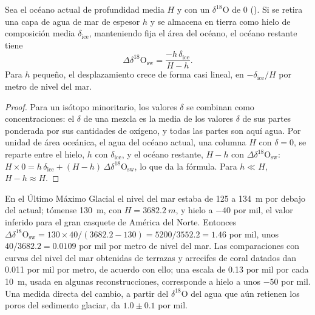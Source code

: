 \begin{proposition}\label{prop:b2:climate-proxies:mass-balance}
Sea el océano actual de profundidad media $H$ y con un $\delta^{18}$O de 0 (). Si se retira una capa de agua
de mar de espesor $h$ y se almacena en tierra como hielo de composición media
$\delta_{\mathrm{ice}}$, manteniendo fija el área del océano, el océano restante tiene
\[
  \Delta\delta^{18}\mathrm{O}_{\mathrm{sw}} = \frac{-h\,\delta_{\mathrm{ice}}}{H - h}.
\]
Para $h$ pequeño, el desplazamiento crece de forma casi lineal, en $-\delta_{\mathrm{ice}}/H$ por metro de nivel del mar.
\end{proposition}

\begin{proof}
Para un isótopo minoritario, los valores $\delta$ se combinan como concentraciones: el $\delta$ de una mezcla es
la media de los valores $\delta$ de sus partes ponderada por sus cantidades de oxígeno, y todas las
partes son aquí agua. Por unidad de área oceánica, el agua del océano actual, una columna $H$ con
$\delta = 0$, se reparte entre el hielo, $h$ con $\delta_{\mathrm{ice}}$, y el océano restante,
$H - h$ con $\Delta\delta^{18}\mathrm{O}_{\mathrm{sw}}$:
$H \times 0 = h\,\delta_{\mathrm{ice}} + (H - h)\,\Delta\delta^{18}\mathrm{O}_{\mathrm{sw}}$, lo que
da la fórmula. Para $h \ll H$, $H - h \approx H$.
\end{proof}

\begin{example}\label{ex:b2:climate-proxies:lgm}
En el Último Máximo Glacial el nivel del mar estaba de 125 a \qty{134}{m} por debajo del actual; tómense \qty{130}{m},
con $H = \qty{3682.2}{m}$, y hielo a $-40$ por mil, el valor inferido para el gran casquete de
América del Norte. Entonces
$\Delta\delta^{18}\mathrm{O}_{\mathrm{sw}} = 130 \times 40/(3682.2 - 130) = 5200/3552.2 = 1.46$
por mil, unos $40/3682.2 = 0.0109$ por mil por metro de nivel del mar. Las comparaciones con curvas del nivel del mar
obtenidas de terrazas y arrecifes de coral datados dan \num{0.011} por mil por metro, de acuerdo con ello; una escala de
\num{0.13} por mil por cada \qty{10}{m}, usada en algunas reconstrucciones, corresponde a hielo a unos
$-50$ por mil. Una medida directa del cambio, a partir del $\delta^{18}$O del agua que aún retienen
los poros del sedimento glaciar, da $1.0 \pm 0.1$ por mil.
\end{example}

